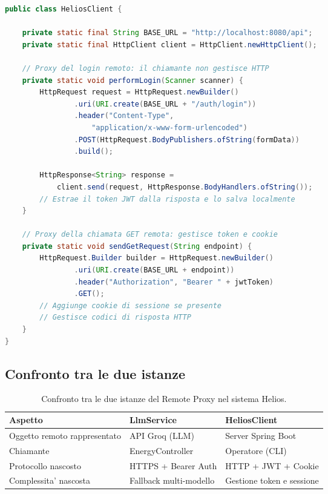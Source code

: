 \documentclass[a4paper,12pt]{report}
\begin{document}
\begin{lstlisting}[language=Java, caption=HeliosClient come Remote Proxy del server Spring Boot]
public class HeliosClient {

    private static final String BASE_URL = "http://localhost:8080/api";
    private static final HttpClient client = HttpClient.newHttpClient();

    // Proxy del login remoto: il chiamante non gestisce HTTP
    private static void performLogin(Scanner scanner) {
        HttpRequest request = HttpRequest.newBuilder()
                .uri(URI.create(BASE_URL + "/auth/login"))
                .header("Content-Type",
                    "application/x-www-form-urlencoded")
                .POST(HttpRequest.BodyPublishers.ofString(formData))
                .build();

        HttpResponse<String> response =
            client.send(request, HttpResponse.BodyHandlers.ofString());
        // Estrae il token JWT dalla risposta e lo salva localmente
    }

    // Proxy della chiamata GET remota: gestisce token e cookie
    private static void sendGetRequest(String endpoint) {
        HttpRequest.Builder builder = HttpRequest.newBuilder()
                .uri(URI.create(BASE_URL + endpoint))
                .header("Authorization", "Bearer " + jwtToken)
                .GET();
        // Aggiunge cookie di sessione se presente
        // Gestisce codici di risposta HTTP
    }
}
\end{lstlisting}

\subsection{Confronto tra le due istanze}

\begin{table}[H]
    \centering
    \begin{tabular}{lll}
        \toprule
        \textbf{Aspetto} & \textbf{LlmService} & \textbf{HeliosClient} \\
        \midrule
        Oggetto remoto rappresentato & API Groq (LLM) & Server Spring Boot \\
        Chiamante & EnergyController & Operatore (CLI) \\
        Protocollo nascosto & HTTPS + Bearer Auth & HTTP + JWT + Cookie \\
        Complessita' nascosta & Fallback multi-modello & Gestione token e sessione \\
        \bottomrule
    \end{tabular}
    \caption{Confronto tra le due istanze del Remote Proxy nel sistema Helios.}
\end{table}
\end{document}
